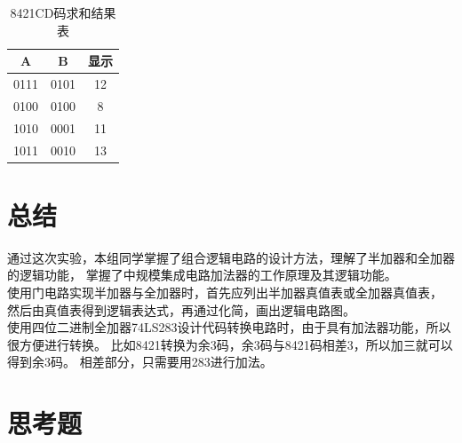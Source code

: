 \documentclass[a4paper,11pt,UTF8]{ctexart}
\begin{document}
\begin{table}[htbp]
	\centering
	
	\begin{tabular}{|c|c|c|}
		\hline
		A     & B     & 显示 \\\hline
		0111  & 0101  & 12 \\\hline
		0100  & 0100  & 8 \\\hline
		1010  & 0001  & 11 \\\hline
		1011  & 0010  & 13 \\\hline
	\end{tabular}%
	\caption{8421CD码求和结果表}
	\label{tab:addlabel}%
\end{table}%




  


  
 

\section{总结}
通过这次实验，本组同学掌握了组合逻辑电路的设计方法，理解了半加器和全加器的逻辑功能，
掌握了中规模集成电路加法器的工作原理及其逻辑功能。
\\
使用门电路实现半加器与全加器时，首先应列出半加器真值表或全加器真值表，
然后由真值表得到逻辑表达式，再通过化简，画出逻辑电路图。\\
使用四位二进制全加器74LS283设计代码转换电路时，由于具有加法器功能，所以很方便进行转换。
比如8421转换为余3码，余3码与8421码相差3，所以加三就可以得到余3码。
相差部分，只需要用283进行加法。

 




\section{思考题}
 \subsection{\expc}
\end{document}
